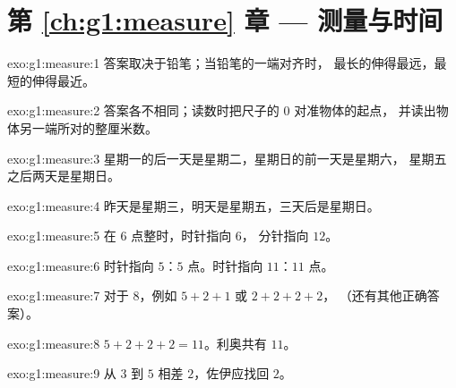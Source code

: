 \section*{第 \ref{ch:g1:measure} 章 --- 测量与时间}

\begin{solution}{exo:g1:measure:1}
答案取决于铅笔；当铅笔的一端对齐时，
最长的伸得最远，最短的伸得最近。
\end{solution}

\begin{solution}{exo:g1:measure:2}
答案各不相同；读数时把尺子的 $0$ 对准物体的起点，
并读出物体另一端所对的整厘米数。
\end{solution}

\begin{solution}{exo:g1:measure:3}
星期一的后一天是星期二，星期日的前一天是星期六，
星期五之后两天是星期日。
\end{solution}

\begin{solution}{exo:g1:measure:4}
昨天是星期三，明天是星期五，三天后是星期日。
\end{solution}

\begin{solution}{exo:g1:measure:5}
在 $6$ 点整时，时针指向 $6$，
分针指向 $12$。
\end{solution}

\begin{solution}{exo:g1:measure:6}
时针指向 $5$：$5$ 点。时针指向 $11$：$11$ 点。
\end{solution}

\begin{solution}{exo:g1:measure:7}
对于 $8$，例如 $5 + 2 + 1$ 或 $2 + 2 + 2 + 2$，
（还有其他正确答案）。
\end{solution}

\begin{solution}{exo:g1:measure:8}
$5 + 2 + 2 + 2 = 11$。利奥共有 $11$。
\end{solution}

\begin{solution}{exo:g1:measure:9}
从 $3$ 到 $5$ 相差 $2$，佐伊应找回 $2$。
\end{solution}
